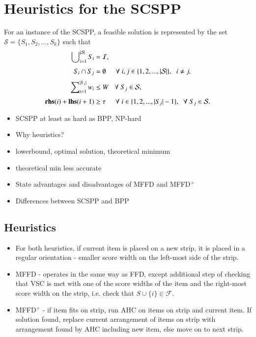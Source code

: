 \documentclass{elsarticle}
\begin{document}
\section{Heuristics for the SCSPP}
\label{sec:scspp}
For an instance of the SCSPP, a feasible solution is represented by the set $\mathcal{S} = \{S_1, S_2, ..., S_k\}$ such that
\begin{subequations}
	\begin{align}
	\bigcup\nolimits_{i=1}^{|\mathcal{S}|} S_i &= \mathcal{I}, \label{eqn:packall}\\[3pt]
	S_i \cap S_j &= \emptyset \hspace{5mm} \forall \hspace{1mm} i, j \in \{1, 2, ..., |\mathcal{S}|\}, \hspace{2mm} i \neq j, \label{eqn:nooverlap} \\[3pt]
	\sum\nolimits_{i=1}^{|S_j|}w_i & \leq W \hspace{3mm} \forall \hspace{1mm} S_j \in \mathcal{S}, \label{eqn:capacity} \\[3pt]
	\textup{\textbf{rhs}}(i) + \textup{\textbf{lhs}}(i+1) &\geq \tau \hspace {5mm} \forall \hspace{1mm} i \in \{1, 2, ..., |S_j|-1\}, \hspace{2mm} \forall \hspace{1mm} S_j \in \mathcal{S}. \label{eqn:vscstrip}
	\end{align}
\end{subequations}

\begin{itemize}
	\item SCSPP at least as hard as BPP, NP-hard
	\item Why heuristics?
	\item lowerbound, optimal solution, theoretical minimum
	\item theoretical min less accurate
	\item State advantages and disadvantages of MFFD and MFFD$^+$
	\item Differences between SCSPP and BPP
\end{itemize}

\subsection{Heuristics}
\label{sub:heuristics}
\begin{itemize}
	\item For both heuristics, if current item is placed on a new strip, it is placed in a regular orientation - smaller score width on the left-most side of the strip.
	\item MFFD - operates in the same way as FFD, except additional step of checking that VSC is met with one of the score widths of the item and the right-most score width on the strip, i.e. check that $S \cup \{i\} \in \mathcal{F}$.
	\item MFFD$^+$ - if item fits on strip, run AHC on items on strip and current item. If solution found, replace current arrangement of items on strip with arrangement found by AHC including new item, else move on to next strip.
\end{itemize}
\end{document}
